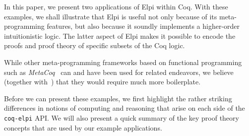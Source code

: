 In this paper, we present two applications of Elpi within Coq. With
these examples, we shall illustrate that Elpi is useful not only
because of its meta-programming features,
but also because it soundly
implements a higher-order intuitionistic logic.  The latter aspect of
Elpi makes it possible to encode the proofs and proof theory of
specific subsets of the Coq logic.


While other meta-programming frameworks based on functional
programming such as \emph{MetaCoq}~\cite{sozeau2020metacoq} can and have been used for related endeavors, we believe (together with~\cite{DunchevCT16}) that they would require much more boilerplate.

Before we can present these examples, we first highlight the rather
striking differences in notions of computing and reasoning that arise
on each side of the \texttt{coq-elpi} API.   We will also present a quick
summary of the key proof theory concepts that are used by our example
applications.


